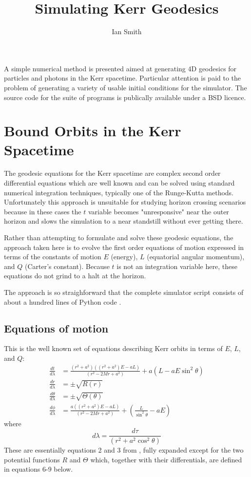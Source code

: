 \documentclass[11pt]{article}
\title{\textbf{Simulating Kerr Geodesics}}
\author{Ian Smith}
\date{}
\begin{document}
\maketitle

\abstract
A simple numerical method is presented aimed at generating 4D geodesics for particles and photons in the Kerr spacetime.  Particular attention is paid to the problem of generating a variety of usable initial conditions for the simulator.  The source code for the suite of programs is publically available under a BSD licence.

\section{Bound Orbits in the Kerr Spacetime}

The geodesic equations for the Kerr spacetime are complex second order differential equations which are well known and can be solved using standard numerical integration techniques, typically one of the Runge-Kutta methods.  Unfortunately this approach is unsuitable for studying horizon crossing scenarios because in these cases the $t$ variable becomes "unresponsive" near the outer horizon and slows the simulation to a near standstill without ever getting there.

Rather than attempting to formulate and solve these geodesic equations, the approach taken here is to evolve the first order equations of motion expressed in terms of the constants of motion $E$ (energy), $L$ (equatorial angular momentum), and $Q$ (Carter's constant).  Because $t$ is not an integration variable here, these equations do not grind to a halt at the horizon.

The approach is so straighforward that the complete simulator script consists of about a hundred lines of Python code \cite{m4r35n357}.

\subsection {Equations of motion}

This is the well known set of equations describing Kerr orbits in terms of $E$, $L$, and $Q$:
\begin{align}
\frac{d t}{d \lambda} &= \frac{(r^2 + a^2) \left((r^2 + a^2) E - aL \right)} {(r^2 - 2Mr  + a^2)} + a(L - aE \sin^2 \theta) \\
\frac{d r}{d \lambda} &= \pm \sqrt {R(r)} \\
\frac{d \theta}{d \lambda} &= \pm \sqrt {\Theta (\theta)} \\
\frac{d \phi}{d \lambda} &= \frac{a \left((r^2 + a^2) E - aL \right)} {(r^2 - 2Mr  + a^2)} + \left(\frac {L} {\sin^2 \theta} -aE \right)
\end{align}
where
\begin{equation}
d \lambda = \frac {d \tau} {(r^2 + a^2 \cos^2\theta)}
\end{equation}
These are essentially equations 2 and 3 from \cite{wilkins}, fully expanded except for the two potential functions $R$ and $\Theta$ which, together with their differentials, are defined in equations 6-9 below.
\end{document}
